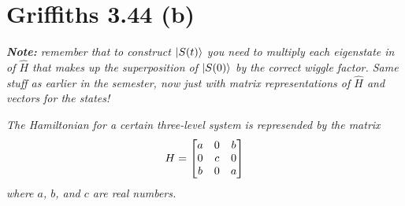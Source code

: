 \documentclass[12pt]{article}
\begin{document}
\newpage

\section*{Griffiths 3.44 (b)}
\emph{\textbf{Note:} remember that to construct $\ket{S(t)}$ you need to multiply each eigenstate in of $\hat{H}$ that makes up the superposition of $\ket{S(0)}$ by the correct wiggle factor. Same stuff as earlier in the semester, now just with matrix representations of $\hat{H}$ and vectors for the states!}
\bigskip

\emph{The Hamiltonian for a certain three-level system is represended by the matrix}
\[H = \mqty[a&0&b\\0&c&0\\b&0&a]\]
\emph{where $a$, $b$, and $c$ are real numbers.}
\end{document}
